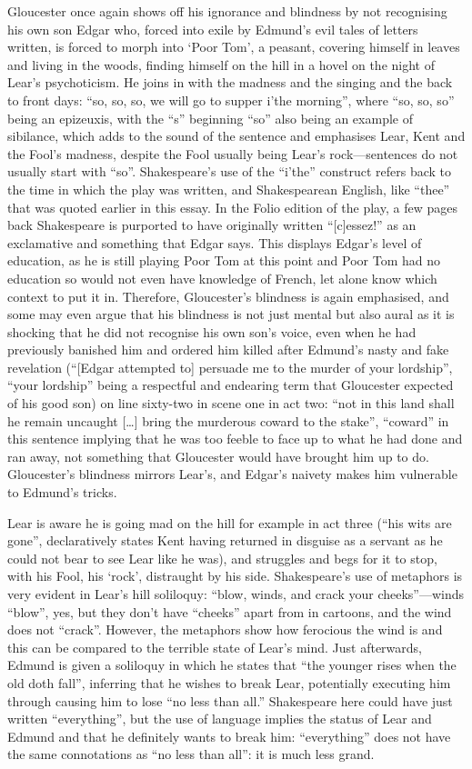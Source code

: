 \documentclass[a4paper]{article}
\begin{document}
Gloucester once again shows off his ignorance and blindness by not recognising his own son Edgar who, forced into exile by Edmund's evil tales of letters written, is forced to morph into `Poor Tom', a peasant, covering himself in leaves and living in the woods, finding himself on the hill in a hovel on the night of Lear's psychoticism. He joins in with the madness and the singing and the back to front days: ``so, so, so, we will go to supper i'the morning'', where ``so, so, so'' being an epizeuxis, with the ``s'' beginning ``so'' also being an example of sibilance, which adds to the sound of the sentence and emphasises Lear, Kent and the Fool's madness, despite the Fool usually being Lear's rock---sentences do not usually start with ``so''. Shakespeare's use of the ``i'the'' construct refers back to the time in which the play was written, and Shakespearean English, like ``thee'' that was quoted earlier in this essay. In the Folio edition of the play, a few pages back Shakespeare is purported to have originally written ``[c]essez!'' as an exclamative and something that Edgar says. This displays Edgar's level of education, as he is still playing Poor Tom at this point and Poor Tom had no education so would not even have knowledge of French, let alone know which context to put it in. Therefore, Gloucester's blindness is again emphasised, and some may even argue that his blindness is not just mental but also aural as it is shocking that he did not recognise his own son's voice, even when he had previously banished him and ordered him killed after Edmund's nasty and fake revelation (``[Edgar attempted to] persuade me to the murder of your lordship'', ``your lordship'' being a respectful and endearing term that Gloucester expected of his good son) on line sixty-two in scene one in act two: ``not in this land shall he remain uncaught [\ldots] bring the murderous coward to the stake'', ``coward'' in this sentence implying that he was too feeble to face up to what he had done and ran away, not something that Gloucester would have brought him up to do. Gloucester's blindness mirrors Lear's, and Edgar's naivety makes him vulnerable to Edmund's tricks.

Lear is aware he is going mad on the hill for example in act three (``his wits are gone'', declaratively states Kent having returned in disguise as a servant as he could not bear to see Lear like he was), and struggles and begs for it to stop, with his Fool, his `rock', distraught by his side. Shakespeare's use of metaphors is very evident in Lear's hill soliloquy: ``blow, winds, and crack your cheeks''---winds ``blow'', yes, but they don't have ``cheeks'' apart from in cartoons, and the wind does not ``crack''. However, the metaphors show how ferocious the wind is and this can be compared to the terrible state of Lear's mind. Just afterwards, Edmund is given a soliloquy in which he states that ``the younger rises when the old doth fall'', inferring that he wishes to break Lear, potentially executing him through causing him to lose ``no less than all.'' Shakespeare here could have just written ``everything'', but the use of language implies the status of Lear and Edmund and that he definitely wants to break him: ``everything'' does not have the same connotations as ``no less than all'': it is much less grand.
\end{document}
